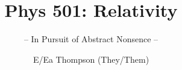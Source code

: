 \documentclass[graybox,envcountchap,sectrefs]{style/svmono}
\begin{document}
\author{E/Ea Thompson (They/Them)}
\title{Phys 501: Relativity}
\subtitle{-- In Pursuit of Abstract Nonsence --}
\maketitle

\frontmatter%

% 
% 

% 

\tableofcontents




\mainmatter%
%








\backmatter%
% 
% 
% 
\printindex

\end{document}
